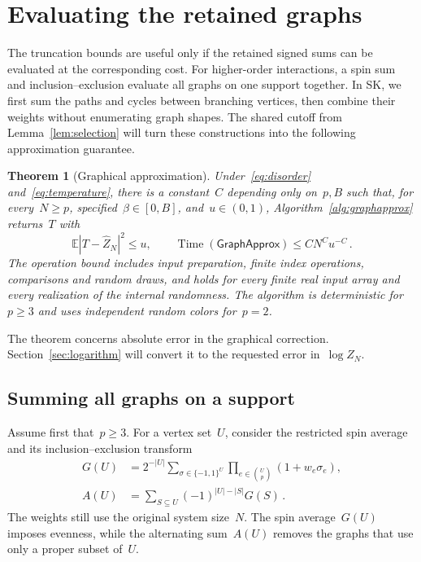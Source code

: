 \documentclass[10pt]{article}
\theoremstyle{plain}
\newtheorem{theorem}{Theorem}[section]
\theoremstyle{definition}
\theoremstyle{remark}
\begin{document}
\section{Evaluating the retained graphs}\label{sec:sk-algebra}
The truncation bounds are useful only if the retained signed sums can be evaluated at the corresponding cost. For higher-order interactions, a spin sum and inclusion--exclusion evaluate all graphs on one support together. In SK, we first sum the paths and cycles between branching vertices, then combine their weights without enumerating graph shapes. The shared cutoff from Lemma~\ref{lem:selection} will turn these constructions into the following approximation guarantee.

\begin{theorem}[Graphical approximation]\label{thm:mean-square}
Under~\eqref{eq:disorder} and~\eqref{eq:temperature}, there is a constant~$C$ depending only on~$p,B$ such that, for every~$N\ge p$, specified~$\beta\in[0,B]$, and~$u\in(0,1)$, Algorithm~\ref{alg:graphapprox} returns~$T$ with
\begin{equation}\label{eq:mean-square}
 \mathbb E|T-\hat Z_N|^2\le u,\qquad
 \operatorname{Time}(\mathsf{GraphApprox})\le CN^Cu^{-C}\,.
\end{equation}
The operation bound includes input preparation, finite index operations, comparisons and random draws, and holds for every finite real input array and every realization of the internal randomness. The algorithm is deterministic for~$p\ge3$ and uses independent random colors for~$p=2$.
\end{theorem}
The theorem concerns absolute error in the graphical correction. Section~\ref{sec:logarithm} will convert it to the requested error in~$\log Z_N$.

\subsection{Summing all graphs on a support}
Assume first that~$p\ge3$. For a vertex set~$U$, consider the restricted spin average and its inclusion--exclusion transform
\begin{equation}\label{eq:tail-support-transform}
 \begin{aligned}
 G(U)&=2^{-|U|}\sum_{\sigma\in\{-1,1\}^{U}}\prod_{e\in\binom Up}(1+w_e\sigma_e),\\
 A(U)&=\sum_{S\subseteq U}(-1)^{|U|-|S|}G(S)\,.
 \end{aligned}
\end{equation}
The weights still use the original system size~$N$. The spin average~$G(U)$ imposes evenness, while the alternating sum~$A(U)$ removes the graphs that use only a proper subset of~$U$.
\end{document}
